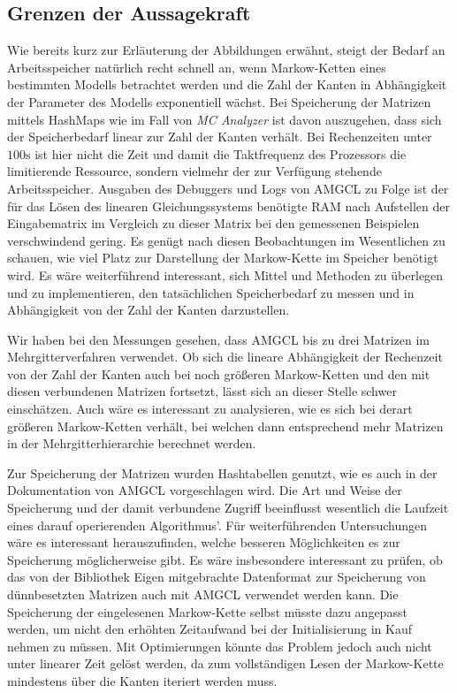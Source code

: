 \documentclass[a4paper]{article}
\newcommand{\mc}{Markow-Kette}
\theoremstyle{nonumberplain}
\begin{document}
	\subsection{Grenzen der Aussagekraft}
	
	Wie bereits kurz zur Erläuterung der Abbildungen erwähnt, steigt der Bedarf an Arbeitsspeicher natürlich recht schnell an, wenn \mc{}n eines bestimmten Modells betrachtet werden und die Zahl der Kanten in Abhängigkeit der Parameter des Modells exponentiell wächst. Bei Speicherung der Matrizen mittels HashMaps wie im Fall von \textit{MC Analyzer} ist davon auszugehen, dass sich der Speicherbedarf linear zur Zahl der Kanten verhält.
	Bei Rechenzeiten unter $100\mathrm{s}$ ist hier nicht die Zeit und damit die Taktfrequenz des Prozessors die limitierende Ressource, sondern vielmehr der zur Verfügung stehende Arbeitsspeicher. Ausgaben des Debuggers und Logs von AMGCL zu Folge ist der für das Lösen des linearen Gleichungssystems benötigte RAM nach Aufstellen der Eingabematrix im Vergleich zu dieser Matrix bei den gemessenen Beispielen verschwindend gering. Es genügt nach diesen Beobachtungen im Wesentlichen zu schauen, wie viel Platz zur Darstellung der \mc{} im Speicher benötigt wird. Es wäre weiterführend interessant, sich Mittel und Methoden zu überlegen und zu implementieren, den tatsächlichen Speicherbedarf zu messen und in Abhängigkeit von der Zahl der Kanten darzustellen.
	
	Wir haben bei den Messungen gesehen, dass AMGCL bis zu drei Matrizen im Mehrgitterverfahren verwendet. Ob sich die lineare Abhängigkeit der Rechenzeit von der Zahl der Kanten auch bei noch größeren \mc{}n und den mit diesen verbundenen Matrizen fortsetzt, lässt sich an dieser Stelle schwer einschätzen. Auch wäre es interessant zu analysieren, wie es sich bei derart größeren \mc{}n verhält, bei welchen dann entsprechend mehr Matrizen in der Mehrgitterhierarchie berechnet werden. 
	
	Zur Speicherung der Matrizen wurden Hashtabellen genutzt, wie es auch in der Dokumentation von AMGCL vorgeschlagen wird. Die Art und Weise der Speicherung und der damit verbundene Zugriff beeinflusst wesentlich die Laufzeit eines darauf operierenden Algorithmus'. Für weiterführenden Untersuchungen wäre es interessant herauszufinden, welche besseren Möglichkeiten es zur Speicherung möglicherweise gibt. Es wäre insbesondere interessant zu prüfen, ob das von der Bibliothek Eigen mitgebrachte Datenformat zur Speicherung von dünnbesetzten Matrizen auch mit AMGCL verwendet werden kann. Die Speicherung der eingelesenen \mc{} selbst müsste dazu angepasst werden, um nicht den erhöhten Zeitaufwand bei der Initialisierung in Kauf nehmen zu müssen. Mit Optimierungen könnte das Problem jedoch auch nicht unter linearer Zeit gelöst werden, da zum vollständigen Lesen der \mc{} mindestens über die Kanten iteriert werden muss.
	
\end{document}
